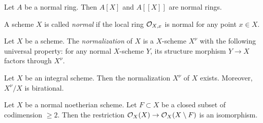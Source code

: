     \begin{proposition}
        Let $A$ be a normal ring.
        Then $A[X]$ and $A[[X]]$ are normal rings.
    \end{proposition}

    \begin{definition}
        A scheme $X$ is called \textit{normal} if the local ring $\mathcal{O}_{X,x}$ is normal for any point $x\in X$.
    \end{definition}

    \begin{example}
        
    \end{example}

    \begin{definition}
        Let $X$ be a scheme.
        The \textit{normalization} of $X$ is a $X$-scheme $X^\nu$ with the following universal property:
        for any normal $X$-scheme $Y$, its structure morphism $Y \to X$ factors through $X^\nu$.
    \end{definition}

    \begin{proposition}
        Let $X$ be an integral scheme.
        Then the normalization $X^\nu$ of $X$ exists.
        Moreover, $X^\nu/X$ is birational.
    \end{proposition}

    \begin{theorem}
        Let $X$ be a normal noetherian scheme.
        Let $F \subset X$ be a closed subset of codimension $\geq 2$.
        Then the restriction $\mathcal{O}_X(X) \to \mathcal{O}_X(X\setminus F)$ is an isomorphism.
    \end{theorem}
